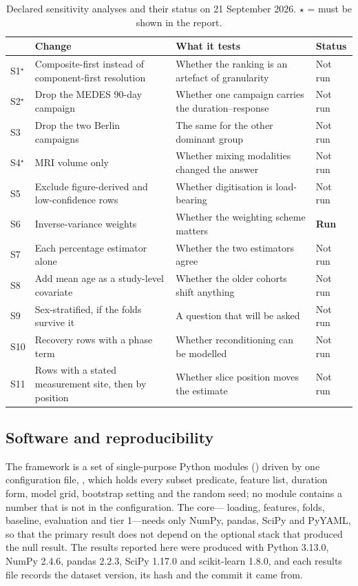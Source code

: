 \begin{table}[htbp]
\centering
\caption{Declared sensitivity analyses and their status on 21 September 2026. $\star$ = must be shown in the report.}
\label{tab:sensitivity}
\small
\begin{tabularx}{\linewidth}{@{}l Y Y l@{}}
\toprule
& Change & What it tests & Status \\
\midrule
S1$^\star$ & Composite-first instead of component-first resolution & Whether the ranking is an artefact of granularity & Not run \\
S2$^\star$ & Drop the MEDES 90-day campaign & Whether one campaign carries the duration--response & Not run \\
S3 & Drop the two Berlin campaigns & The same for the other dominant group & Not run \\
S4$^\star$ & MRI volume only & Whether mixing modalities changed the answer & Not run \\
S5 & Exclude figure-derived and low-confidence rows & Whether digitisation is load-bearing & Not run \\
S6 & Inverse-variance weights & Whether the weighting scheme matters & \textbf{Run} \\
S7 & Each percentage estimator alone & Whether the two estimators agree & Not run \\
S8 & Add mean age as a study-level covariate & Whether the older cohorts shift anything & Not run \\
S9 & Sex-stratified, if the folds survive it & A question that will be asked & Not run \\
S10 & Recovery rows with a phase term & Whether reconditioning can be modelled & Not run \\
S11 & Rows with a stated measurement site, then by position & Whether slice position moves the estimate & Not run \\
\bottomrule
\end{tabularx}
\end{table}

\subsection{Software and reproducibility}
\label{sec:reproducibility}

The framework is a set of single-purpose Python modules () driven by one configuration file,
, which holds every subset predicate, feature list, duration form, model grid,
bootstrap setting and the random seed; no module contains a number that is not in the configuration. The core---
loading, features, folds, baseline, evaluation and tier 1---needs only NumPy, pandas, SciPy and PyYAML, so that the
primary result does not depend on the optional stack that produced the null result. The results reported here were
produced with Python 3.13.0, NumPy 2.4.6, pandas 2.2.3, SciPy 1.17.0 and scikit-learn 1.8.0, and each results file
records the dataset version, its hash and the commit it came from.

